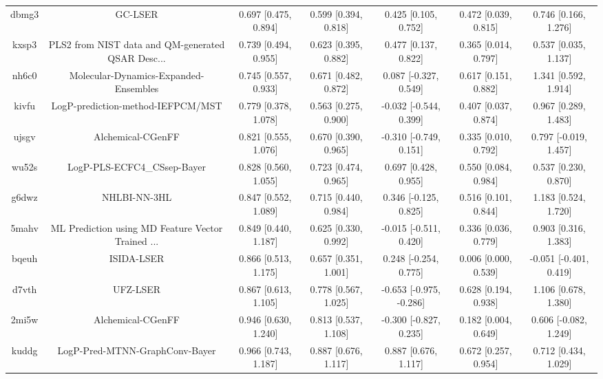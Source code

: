 \documentclass{article}
\begin{document}
\begin{center}
\begin{longtable}{|ccccccc|}
 dbmg3 &                                            GC-LSER &  0.697 [0.475, 0.894] &  0.599 [0.394, 0.818] &     0.425 [0.105, 0.752] &  0.472 [0.039, 0.815] &    0.746 [0.166, 1.276] \\
 kxsp3 &  PLS2 from NIST data and QM-generated QSAR Desc... &  0.739 [0.494, 0.955] &  0.623 [0.395, 0.882] &     0.477 [0.137, 0.822] &  0.365 [0.014, 0.797] &    0.537 [0.035, 1.137] \\
 nh6c0 &              Molecular-Dynamics-Expanded-Ensembles &  0.745 [0.557, 0.933] &  0.671 [0.482, 0.872] &    0.087 [-0.327, 0.549] &  0.617 [0.151, 0.882] &    1.341 [0.592, 1.914] \\
 kivfu &                  LogP-prediction-method-IEFPCM/MST &  0.779 [0.378, 1.078] &  0.563 [0.275, 0.900] &   -0.032 [-0.544, 0.399] &  0.407 [0.037, 0.874] &    0.967 [0.289, 1.483] \\
 ujsgv &                                  Alchemical-CGenFF &  0.821 [0.555, 1.076] &  0.670 [0.390, 0.965] &   -0.310 [-0.749, 0.151] &  0.335 [0.010, 0.792] &   0.797 [-0.019, 1.457] \\
 wu52s &                        LogP-PLS-ECFC4\_CSsep-Bayer &  0.828 [0.560, 1.055] &  0.723 [0.474, 0.965] &     0.697 [0.428, 0.955] &  0.550 [0.084, 0.984] &    0.537 [0.230, 0.870] \\
 g6dwz &                                       NHLBI-NN-3HL &  0.847 [0.552, 1.089] &  0.715 [0.440, 0.984] &    0.346 [-0.125, 0.825] &  0.516 [0.101, 0.844] &    1.183 [0.524, 1.720] \\
 5mahv &  ML Prediction using MD Feature Vector Trained ... &  0.849 [0.440, 1.187] &  0.625 [0.330, 0.992] &   -0.015 [-0.511, 0.420] &  0.336 [0.036, 0.779] &    0.903 [0.316, 1.383] \\
 bqeuh &                                         ISIDA-LSER &  0.866 [0.513, 1.175] &  0.657 [0.351, 1.001] &    0.248 [-0.254, 0.775] &  0.006 [0.000, 0.539] &  -0.051 [-0.401, 0.419] \\
 d7vth &                                           UFZ-LSER &  0.867 [0.613, 1.105] &  0.778 [0.567, 1.025] &  -0.653 [-0.975, -0.286] &  0.628 [0.194, 0.938] &    1.106 [0.678, 1.380] \\
 2mi5w &                                  Alchemical-CGenFF &  0.946 [0.630, 1.240] &  0.813 [0.537, 1.108] &   -0.300 [-0.827, 0.235] &  0.182 [0.004, 0.649] &   0.606 [-0.082, 1.249] \\
 kuddg &                     LogP-Pred-MTNN-GraphConv-Bayer &  0.966 [0.743, 1.187] &  0.887 [0.676, 1.117] &     0.887 [0.676, 1.117] &  0.672 [0.257, 0.954] &    0.712 [0.434, 1.029] \\

\end{longtable}
\end{center}
\end{document}
